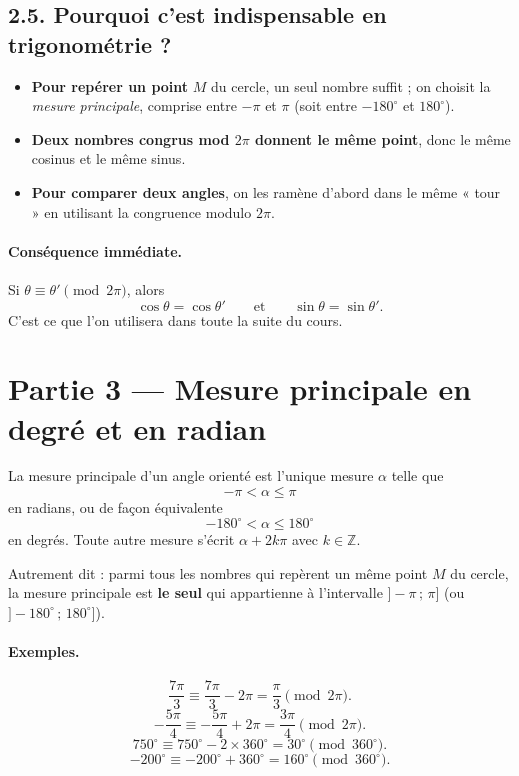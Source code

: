 \documentclass[11pt,a4paper]{article}
\begin{document}
\subsection*{2.5. Pourquoi c'est indispensable en trigonométrie ?}

\begin{itemize}
  \item \textbf{Pour repérer un point} $M$ du cercle, un seul nombre suffit ; on choisit la \emph{mesure principale}, comprise entre $-\pi$ et $\pi$ (soit entre $-180^\circ$ et $180^\circ$).
  \item \textbf{Deux nombres congrus mod $2\pi$ donnent le même point}, donc le même cosinus et le même sinus.
  \item \textbf{Pour comparer deux angles}, on les ramène d'abord dans le même « tour » en utilisant la congruence modulo $2\pi$.
\end{itemize}

\paragraph{Conséquence immédiate.}
Si $\theta\equiv\theta'\pmod{2\pi}$, alors
\[
\cos\theta=\cos\theta'
\qquad\text{et}\qquad
\sin\theta=\sin\theta'.
\]
C'est ce que l'on utilisera dans toute la suite du cours.

\clearpage
\section*{Partie 3 — Mesure principale en degré et en radian}

La mesure principale d'un angle orienté est l'unique mesure $\alpha$ telle que
\[
-\pi<\alpha\le \pi
\]
en radians, ou de façon équivalente
\[
-180^\circ<\alpha\le 180^\circ
\]
en degrés. Toute autre mesure s'écrit $\alpha+2k\pi$ avec $k\in\mathbb{Z}$.

Autrement dit : parmi tous les nombres qui repèrent un même point $M$ du cercle, la mesure principale est \textbf{le seul} qui appartienne à l'intervalle $]-\pi\,;\,\pi]$ (ou $]-180^\circ\,;\,180^\circ]$).

\paragraph{Exemples.}
\[
\dfrac{7\pi}{3}\equiv \dfrac{7\pi}{3}-2\pi=\dfrac{\pi}{3}\pmod{2\pi}.
\]
\[
-\dfrac{5\pi}{4}\equiv -\dfrac{5\pi}{4}+2\pi=\dfrac{3\pi}{4}\pmod{2\pi}.
\]
\[
750^\circ\equiv 750^\circ-2\times 360^\circ=30^\circ\pmod{360^\circ}.
\]
\[
-200^\circ\equiv -200^\circ+360^\circ=160^\circ\pmod{360^\circ}.
\]
\end{document}

